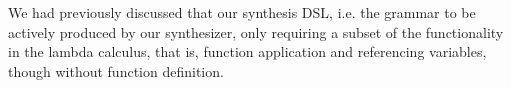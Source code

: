 \documentclass{article}
\begin{document}
We had previously discussed that our synthesis DSL,
i.e. the grammar to be actively produced by our synthesizer,
only requiring a subset of the functionality in the lambda calculus,
that is, function application and referencing variables,
though without function definition.

\end{document}
